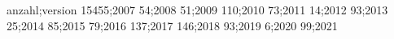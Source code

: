 anzahl;version
15455;2007
54;2008
51;2009
110;2010
73;2011
14;2012
93;2013
25;2014
85;2015
79;2016
137;2017
146;2018
93;2019
6;2020
99;2021
